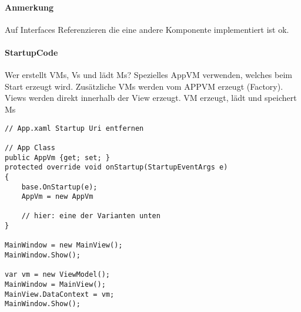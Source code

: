 \paragraph{Anmerkung} Auf Interfaces Referenzieren die eine andere Komponente implementiert ist ok.
\paragraph{StartupCode} Wer erstellt VMs, Vs und lädt Ms? Spezielles AppVM verwenden, welches beim Start erzeugt wird. Zusätzliche VMs werden vom APPVM erzeugt (Factory). Views werden direkt innerhalb der View erzeugt. VM erzeugt, lädt und speichert Ms

\begin{lstlisting}
// App.xaml Startup Uri entfernen

// App Class
public AppVm {get; set; }
protected override void onStartup(StartupEventArgs e)
{
    base.OnStartup(e);
    AppVm = new AppVm
    
    // hier: eine der Varianten unten
}

MainWindow = new MainView();
MainWindow.Show();

var vm = new ViewModel();
MainWindow = MainView();
MainView.DataContext = vm;
MainWindow.Show();
\end{lstlisting}